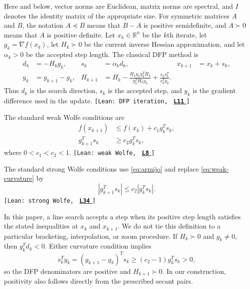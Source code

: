 \documentclass[11pt]{article}
\newcommand{\R}{\mathbb R}
\newcommand{\leanLinkText}[1]{%
  \underline{\textbf{#1}}%
}
\newcommand{\leanSnapshot}{e308927f5b7930bdd002f0c0e42b9d112ad821cb}
\newcommand{\leanClaimTag}[3]{%
  {\footnotesize\texttt{[Lean: #1, }}%
  \href{https://github.com/imathwy/DFP_wolfe_local/blob/\leanSnapshot/#2?plain=1\#L#3}%
    {\leanLinkText{\footnotesize\texttt{L#3}}}%
  {\footnotesize\texttt{]}}\enspace
}
\begin{document}
Here and below, vector norms are Euclidean, matrix norms are spectral, and $I$
denotes the identity matrix of the appropriate size.  For symmetric matrices
$A$ and $B$, the notation $A\preceq B$ means that $B-A$ is positive
semidefinite, and $A\succ0$ means that $A$ is positive definite.  Let
$x_k\in\R^n$ be the $k$th iterate, let $g_k=\nabla f(x_k)$, let $H_k\succ0$ be
the current inverse Hessian approximation, and let $\alpha_k>0$ be the
accepted step length.  The classical DFP method is
\begin{align*}
d_k&=-H_kg_k,&s_k&=\alpha_kd_k,&x_{k+1}&=x_k+s_k,\\
y_k&=g_{k+1}-g_k,&
H_{k+1}&=H_k-
\frac{H_ky_ky_k^TH_k}{y_k^TH_ky_k}
+\frac{s_ks_k^T}{s_k^Ty_k}.
\end{align*}
Thus $d_k$ is the search direction, $s_k$ is the accepted step, and
$y_k$ is the gradient difference used in the update.
\leanClaimTag{DFP iteration}{DFPWolfe/A_uniformly_convex_counterexample_to_global_convergence_of_DFP_under_weak_Wolfe_/Definition_2_1_Classical_inverse_form_DFP_iteration.lean}{11}
The standard weak Wolfe conditions \cite{Wolfe1969} are
\begin{align}
f(x_{k+1})&\le f(x_k)+c_1g_k^Ts_k,\label{eq:armijo}\\
g_{k+1}^Ts_k&\ge c_2g_k^Ts_k,
\label{eq:weak-curvature}
\end{align}
where $0<c_1<c_2<1$.
\leanClaimTag{weak Wolfe}{DFPWolfe/A_uniformly_convex_counterexample_to_global_convergence_of_DFP_under_weak_Wolfe_/Definition_2_2_Standard_weak_Wolfe_conditions.lean}{8}
The standard strong Wolfe conditions use \eqref{eq:armijo} and replace
\eqref{eq:weak-curvature} by
\begin{equation}\label{eq:strong-curvature}
|g_{k+1}^Ts_k|\le c_2|g_k^Ts_k|.
\end{equation}
\leanClaimTag{strong Wolfe}{ReasLib/Optimization/DFP/StrongWolfeCounterexample.lean}{34}
In this paper, a line search accepts a step when its positive step length
satisfies the stated inequalities at $x_k$ and $x_{k+1}$.  We do not tie this
definition to a particular bracketing, interpolation, or zoom procedure.  If
$H_k\succ0$ and $g_k\ne0$, then
$g_k^Td_k<0$.  Either curvature condition
implies
\[
s_k^Ty_k=(g_{k+1}-g_k)^Ts_k
\ge (c_2-1)g_k^Ts_k>0,
\]
so the DFP denominators are positive and $H_{k+1}\succ0$.  In our
construction, positivity also follows directly from the prescribed secant
pairs.
\end{document}
